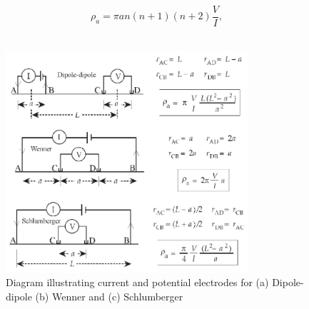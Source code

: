 \documentclass[12pt,a4paper]{report}
\begin{document}
\begin{equation}
    \rho_a = \pi an (n + 1)(n + 2) \frac{V}{I},
\end{equation}
\\
\begin{figure}[H]
    \centering
    \includegraphics[width=0.8\textwidth]{Dispositions.png}
    \caption{Diagram illustrating current and potential electrodes for (a) Dipole-dipole (b) Wenner and (c) Schlumberger}
\end{figure}
\end{document}
